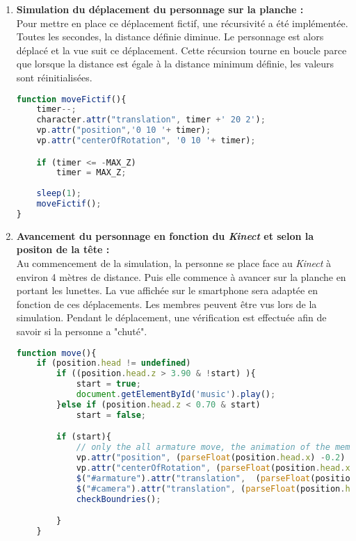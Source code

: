 \begin{enumerate}
\item \textbf{Simulation du déplacement du personnage sur la planche : } \\
Pour mettre en place ce déplacement fictif, une récursivité a été implémentée. Toutes les secondes, la distance définie diminue. Le personnage est alors déplacé et la vue suit ce déplacement. Cette récursion tourne en boucle parce que lorsque la distance est égale à la distance minimum définie, les valeurs sont réinitialisées.

\begin{lstlisting}[language=JavaScript]	
function moveFictif(){
	timer--;
	character.attr("translation", timer +' 20 2');
	vp.attr("position",'0 10 '+ timer);
	vp.attr("centerOfRotation", '0 10 '+ timer);

	if (timer <= -MAX_Z)
		timer = MAX_Z;
	
	sleep(1);
	moveFictif();
}
\end{lstlisting}


\item \textbf{Avancement du personnage en fonction du \textit{Kinect} et selon la positon de la tête :} \\
Au commencement de la simulation, la personne se place face au \textit{Kinect} à environ 4 mètres de distance. Puis elle commence à avancer sur la planche en portant les lunettes. La vue affichée sur le \textsf{smartphone} sera adaptée en fonction de ces déplacements. Les membres peuvent être vus lors de la simulation. Pendant le déplacement, une vérification est effectuée afin de savoir si la personne a "chuté".

\begin{lstlisting}[language=JavaScript]	
function move(){
	if (position.head != undefined)
		if ((position.head.z > 3.90 & !start) ){
			start = true; 
			document.getElementById('music').play();
		}else if (position.head.z < 0.70 & start)
			start = false;

		if (start){
			// only the all armature move, the animation of the member is not handle here
			vp.attr("position", (parseFloat(position.head.x) -0.2) + " " + (parseFloat(position.head.y) -0.2)+ " " + (parseFloat(position.head.z) -0.2));
			vp.attr("centerOfRotation", (parseFloat(position.head.x) -0.2) + " " + (parseFloat(position.head.y) -0.2)+ " " + (parseFloat(position.head.z) -0.2));
			$("#armature").attr("translation",  (parseFloat(position.head.z) - 4.0) + " 7.3 0");
			$("#camera").attr("translation", (parseFloat(position.head.z) - 4.0) + " 8 " + (parseFloat(position.head.x) -0.2) );
			checkBoundries();

		}
	}
\end{lstlisting}
\end{enumerate}

